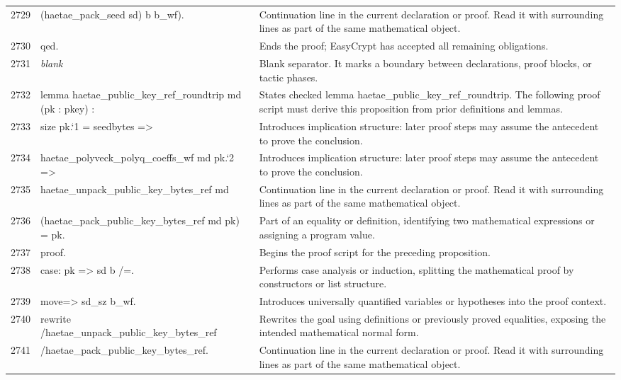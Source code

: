 \documentclass[10pt]{article}
\begin{document}
\begin{longtable}{r L{0.53\textwidth} L{0.37\textwidth}}
2729 & {\ttfamily\scriptsize               (haetae\_pack\_seed sd) b b\_wf).} & Continuation line in the current declaration or proof.  Read it with surrounding lines as part of the same mathematical object. \\
2730 & {\ttfamily\scriptsize qed.} & Ends the proof; EasyCrypt has accepted all remaining obligations. \\
2731 & {\ttfamily\scriptsize \emph{blank}} & Blank separator.  It marks a boundary between declarations, proof blocks, or tactic phases. \\
2732 & {\ttfamily\scriptsize lemma haetae\_public\_key\_ref\_roundtrip md (pk : pkey) :} & States checked lemma haetae\_public\_key\_ref\_roundtrip.  The following proof script must derive this proposition from prior definitions and lemmas. \\
2733 & {\ttfamily\scriptsize   size pk.`1 = seedbytes =>} & Introduces implication structure: later proof steps may assume the antecedent to prove the conclusion. \\
2734 & {\ttfamily\scriptsize   haetae\_polyveck\_polyq\_coeffs\_wf md pk.`2 =>} & Introduces implication structure: later proof steps may assume the antecedent to prove the conclusion. \\
2735 & {\ttfamily\scriptsize   haetae\_unpack\_public\_key\_bytes\_ref md} & Continuation line in the current declaration or proof.  Read it with surrounding lines as part of the same mathematical object. \\
2736 & {\ttfamily\scriptsize     (haetae\_pack\_public\_key\_bytes\_ref md pk) = pk.} & Part of an equality or definition, identifying two mathematical expressions or assigning a program value. \\
2737 & {\ttfamily\scriptsize proof.} & Begins the proof script for the preceding proposition. \\
2738 & {\ttfamily\scriptsize case: pk => sd b /=.} & Performs case analysis or induction, splitting the mathematical proof by constructors or list structure. \\
2739 & {\ttfamily\scriptsize move=> sd\_sz b\_wf.} & Introduces universally quantified variables or hypotheses into the proof context. \\
2740 & {\ttfamily\scriptsize rewrite /haetae\_unpack\_public\_key\_bytes\_ref} & Rewrites the goal using definitions or previously proved equalities, exposing the intended mathematical normal form. \\
2741 & {\ttfamily\scriptsize         /haetae\_pack\_public\_key\_bytes\_ref.} & Continuation line in the current declaration or proof.  Read it with surrounding lines as part of the same mathematical object. \\

\end{longtable}
\end{document}
